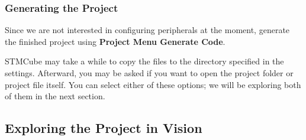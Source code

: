 \documentclass[openany,11pt,fleqn]{book} %
\begin{document}
\subsubsection*{Generating the Project}
Since we are not interested in configuring peripherals at the moment, generate the finished project using \textbf{Project Menu \textrightarrow Generate Code}. 

STMCube may take a while to copy the files to the directory specified in the settings. Afterward, you may be asked if you want to open the project folder or project file itself. You can select either of these options; we will be exploring both of them in the next section. %

%


\subsection{\color{orange}Exploring the Project in {\textmu}Vision}
\end{document}
